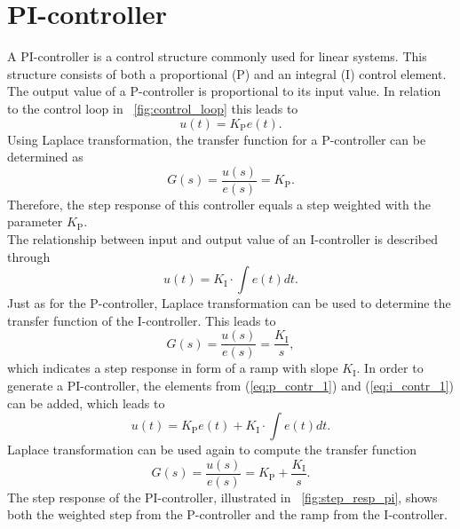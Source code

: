 \section{PI-controller}
A PI-controller is a control structure commonly used for linear systems. This structure consists of both a proportional (P) and an integral (I) control element.
The output value of a P-controller is proportional to its input value. In relation to the control loop in \figurename~\ref{fig:control_loop} this leads to
\begin{equation}
    u(t) = K_{\mathrm{P}}e(t).
 \label{eq:p_contr_1}
\end{equation}
Using Laplace transformation, the transfer function for a P-controller can be determined as
\begin{equation}
    G(s) = \frac{u(s)}{e(s)} = K_{\mathrm{P}}.
 \label{eq:p_contr_2}
\end{equation}
Therefore, the step response of this controller equals a step weighted with the parameter $K_{\mathrm{P}}$.
\\The relationship between input and output value of an I-controller is described through
\begin{equation}
    u(t) = K_{\mathrm{I}}\cdot\int e(t) dt.
 \label{eq:i_contr_1}
\end{equation}
Just as for the P-controller, Laplace transformation can be used to determine the transfer function of the I-controller.
This leads to
\begin{equation}
    G(s) = \frac{u(s)}{e(s)} = \frac{K_{\mathrm{I}}}{s},
 \label{eq:i_contr_2}
\end{equation}
which indicates a step response in form of a ramp with slope $K_{\mathrm{I}}$.
In order to generate a PI-controller, the elements from (\ref{eq:p_contr_1}) and (\ref{eq:i_contr_1}) can be added, which leads to
\begin{equation}
    u(t) = K_{\mathrm{P}}e(t) + K_{\mathrm{I}}\cdot\int e(t) dt.
 \label{eq:pi_contr_1}
\end{equation}
Laplace transformation can be used again to compute the transfer function
\begin{equation}
    G(s) = \frac{u(s)}{e(s)} =  K_{\mathrm{P}} + \frac{K_{\mathrm{I}}}{s}.
 \label{eq:pi_contr_2}
\end{equation}
The step response of the PI-controller, illustrated in \figurename~\ref{fig:step_resp_pi}, shows both the weighted step from the P-controller and the ramp from the I-controller.

